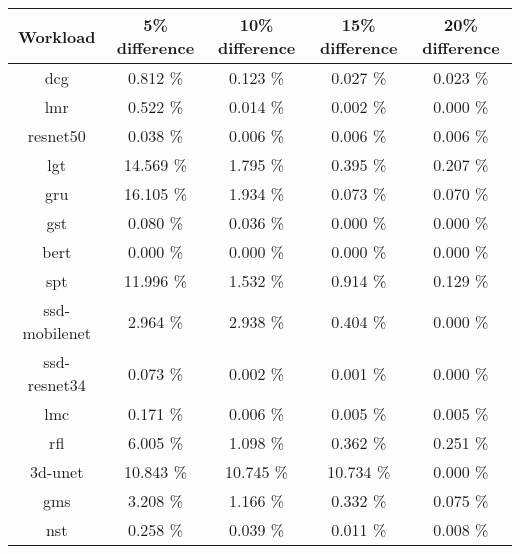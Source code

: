 \begin{tabular}{|c|c|c|c|c|}
\hline
  \textbf{Workload} & \textbf{5\% difference} & \textbf{10\% difference} & \textbf{15\% difference} & \textbf{20\% difference}\\
\hline
\hline
  dcg & 0.812 \% & 0.123 \% & 0.027 \% & 0.023 \%\\
  lmr & 0.522 \% & 0.014 \% & 0.002 \% & 0.000 \%\\
  resnet50 & 0.038 \% & 0.006 \% & 0.006 \% & 0.006 \%\\
  lgt & 14.569 \% & 1.795 \% & 0.395 \% & 0.207 \%\\
  gru & 16.105 \% & 1.934 \% & 0.073 \% & 0.070 \%\\
  gst & 0.080 \% & 0.036 \% & 0.000 \% & 0.000 \%\\
  bert & 0.000 \% & 0.000 \% & 0.000 \% & 0.000 \%\\
  spt & 11.996 \% & 1.532 \% & 0.914 \% & 0.129 \%\\
  ssd-mobilenet & 2.964 \% & 2.938 \% & 0.404 \% & 0.000 \%\\
  ssd-resnet34 & 0.073 \% & 0.002 \% & 0.001 \% & 0.000 \%\\
  lmc & 0.171 \% & 0.006 \% & 0.005 \% & 0.005 \%\\
  rfl & 6.005 \% & 1.098 \% & 0.362 \% & 0.251 \%\\
  3d-unet & 10.843 \% & 10.745 \% & 10.734 \% & 0.000 \%\\
  gms & 3.208 \% & 1.166 \% & 0.332 \% & 0.075 \%\\
  nst & 0.258 \% & 0.039 \% & 0.011 \% & 0.008 \%\\
\hline
\end{tabular}
